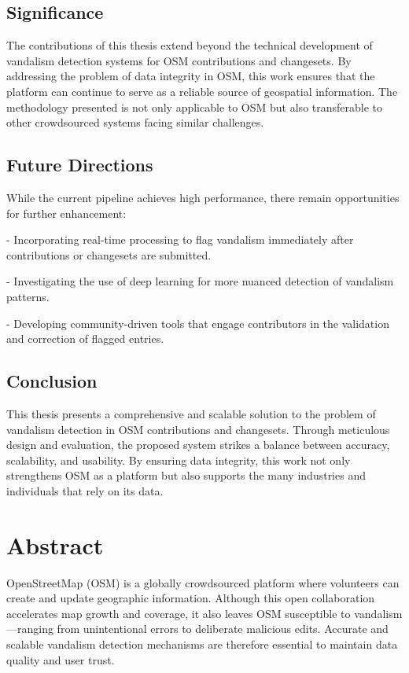 \documentclass[
    13pt, %
    a4paper, %
    DIV14, %
    listof=totoc, %
    bibliography=totoc, %
    index=totoc, %
    headsepline
]{scrreprt}
\begin{document}
\subsection*{Significance}

The contributions of this thesis extend beyond the technical development of vandalism detection systems for OSM contributions and changesets. By addressing the problem of data integrity in OSM, this work ensures that the platform can continue to serve as a reliable source of geospatial information. The methodology presented is not only applicable to OSM but also transferable to other crowdsourced systems facing similar challenges.

\subsection*{Future Directions}

While the current pipeline achieves high performance, there remain opportunities for further enhancement:

\noindent- Incorporating real-time processing to flag vandalism immediately after contributions or changesets are submitted.

\noindent- Investigating the use of deep learning for more nuanced detection of vandalism patterns.

\noindent- Developing community-driven tools that engage contributors in the validation and correction of flagged entries.

\subsection*{Conclusion}

This thesis presents a comprehensive and scalable solution to the problem of vandalism detection in OSM contributions and changesets. Through meticulous design and evaluation, the proposed system strikes a balance between accuracy, scalability, and usability. By ensuring data integrity, this work not only strengthens OSM as a platform but also supports the many industries and individuals that rely on its data.


\newpage
\section*{\LARGE Abstract}

OpenStreetMap (OSM) is a globally crowdsourced platform where volunteers can create and update geographic information. Although this open collaboration accelerates map growth and coverage, it also leaves OSM susceptible to vandalism—ranging from unintentional errors to deliberate malicious edits. Accurate and scalable vandalism detection mechanisms are therefore essential to maintain data quality and user trust.
\end{document}
